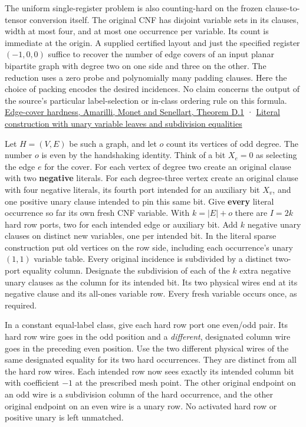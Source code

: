 \documentclass[11pt,a4paper]{article}
\begin{document}
The uniform single-register problem is also counting-hard on the frozen
clause-to-tensor conversion itself. The original CNF has disjoint
variable sets in its clauses, width at most four, and at most one
occurrence per variable. Its count is immediate at the origin. A
supplied certified layout and just the specified register \((-1,0,0)\)
suffice to recover the number of edge covers of an input planar
bipartite graph with degree two on one side and three on the other. The
reduction uses a zero probe and polynomially many padding clauses. Here
the choice of packing encodes the desired incidences. No claim concerns
the output of the source's particular label-selection or in-class
ordering rule on this formula.
\href{https://pierre.senellart.com/publications/amarilli2017conjunctive.pdf}{Edge-cover
hardness, Amarilli, Monet and Senellart, Theorem D.1} ·
\href{https://github.com/openai/math/blob/main/preprints/The-Exponential-Time-Hypothesis-is-False-October-25-2026/build/quantitative-reduction.tex\#L65}{Literal
construction with unary variable leaves and subdivision equalities}

Let \(H=(V,E)\) be such a graph, and let \(o\) count its vertices of odd
degree. The number \(o\) is even by the handshaking identity. Think of a
bit \(X_e=0\) as selecting the edge \(e\) for the cover. For each vertex
of degree two create an original clause with two \textbf{negative}
literals. For each degree-three vertex create an original clause with
four negative literals, its fourth port intended for an auxiliary bit
\(X_v\), and one positive unary clause intended to pin this same bit.
Give \textbf{every} literal occurrence so far its own fresh CNF
variable. With \(k=|E|+o\) there are \(I=2k\) hard row ports, two for
each intended edge or auxiliary bit. Add \(k\) negative unary clauses on
distinct new variables, one per intended bit. In the literal sparse
construction put old vertices on the row side, including each
occurrence's unary \((1,1)\) variable table. Every original incidence is
subdivided by a distinct two-port equality column. Designate the
subdivision of each of the \(k\) extra negative unary clauses as the
column for its intended bit. Its two physical wires end at its negative
clause and its all-ones variable row. Every fresh variable occurs once,
as required.

In a constant equal-label class, give each hard row port one even/odd
pair. Its hard row wire goes in the odd position and a \emph{different},
designated column wire goes in the preceding even position. Use the two
different physical wires of the same designated equality for its two
hard occurrences. They are distinct from all the hard row wires. Each
intended row now sees exactly its intended column bit with coefficient
\(-1\) at the prescribed mesh point. The other original endpoint on an
odd wire is a subdivision column of the hard occurrence, and the other
original endpoint on an even wire is a unary row. No activated hard row
or positive unary is left unmatched.
\end{document}
